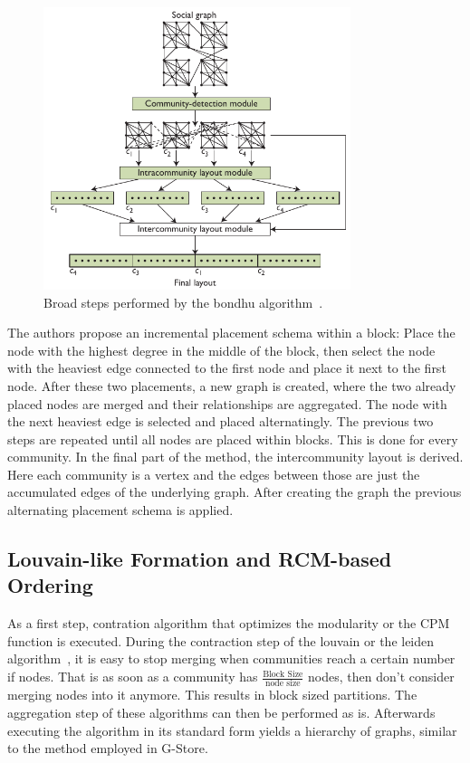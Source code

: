     \begin{figure}[htp]
        \begin{center}
            \includegraphics[keepaspectratio,width=0.8\textwidth]{img/06-rel_w/bondhu.png}
        \end{center}
        \caption{Broad steps performed by the bondhu algorithm~\autocite{hoque2012disk}.} 
        \label{bondhu-fig}
    \end{figure}

    The authors propose an incremental placement schema within a block:
    Place the node with the highest degree in the middle of the block, then select the node with the heaviest edge connected to the first node and place it next to the first node. 
    After these two placements, a new graph is created, where the two already placed nodes are merged and their relationships are aggregated. 
    The node with the next heaviest edge is selected and placed alternatingly. The previous two steps are repeated until all nodes are placed within blocks.
    This is done for every community.
    In the final part of the method, the intercommunity layout is derived. 
    Here each community is a vertex and the edges between those are just the accumulated edges of the underlying graph. 
    After creating the graph the previous alternating placement schema is applied.
    
    \subsection*{Louvain-like Formation and RCM-based Ordering}
        As a first step, contration algorithm that optimizes the modularity or the CPM~\autocite{traag2011narrow, potts1952some} function is executed.
        During the contraction step of the louvain or the leiden algorithm~\autocite{traag2019louvain}, it is easy to stop merging when communities reach a certain number if nodes.
        That is as soon as a community has $\frac{\text{Block Size}}{\text{node size}}$ nodes, then don't consider merging nodes into it anymore.
        This results in block sized partitions.
        The aggregation step of these algorithms can then be performed as is. 
        Afterwards executing the algorithm in its standard form yields a hierarchy of graphs, similar to the method employed in G-Store.
    
